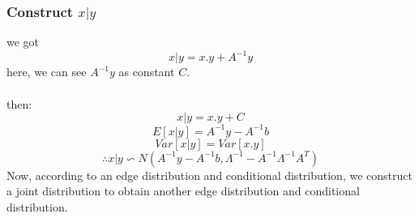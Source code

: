 \documentclass{report}
\begin{document}
\subsubsection{Construct $x|y$}
we got
$$
x|y = x.y + A^{-1}y
$$
here, we can see $A^{-1}y$ as constant $C$.\\\\
then:
$$
x|y = x.y + C
$$
$$
E[x|y] = A^{-1}y - A^{-1}b
$$
$$
Var[x|y]= Var[x.y]
$$
$$
\therefore x|y \backsim N(A^{-1}y - A^{-1}b, \Lambda^{-1}-A^{-1} \Lambda^{-1}A^T)
$$
Now, according to an edge distribution and conditional distribution, we construct a joint distribution to obtain another edge distribution and conditional distribution.
\end{document}
